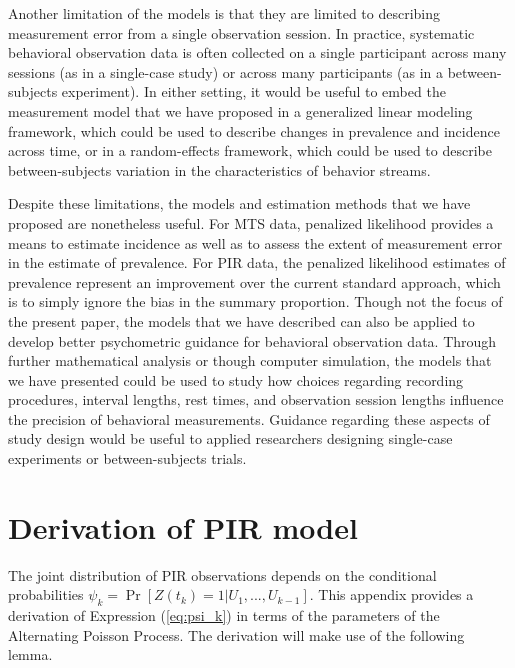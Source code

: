 \documentclass[man, noextraspace, floatsintext]{apa6}\usepackage[]{graphicx}\usepackage[]{color}
\newcommand{\bibfile}{Behavioral_observation-APP}
\begin{document}
Another limitation of the models is that they are limited to describing measurement error from a single observation session. In practice, systematic behavioral observation data is often collected on a single participant across many sessions (as in a single-case study) or across many participants (as in a between-subjects experiment). In either setting, it would be useful to embed the measurement model that we have proposed in a generalized linear modeling framework, which could be used to describe changes in prevalence and incidence across time, or in a random-effects framework, which could be used to describe between-subjects variation in the characteristics of behavior streams.

Despite these limitations, the models and estimation methods that we have proposed are nonetheless useful. For MTS data, penalized likelihood provides a means to estimate incidence as well as to assess the extent of measurement error in the estimate of prevalence. For PIR data, the penalized likelihood estimates of prevalence represent an improvement over the current standard approach, which is to simply ignore the bias in the summary proportion. Though not the focus of the present paper, the models that we have described can also be applied to develop better psychometric guidance for behavioral observation data. Through further mathematical analysis or though computer simulation, the models that we have presented could be used to study how choices regarding recording procedures, interval lengths, rest times, and observation session lengths influence the precision of behavioral measurements. Guidance regarding these aspects of study design would be useful to applied researchers designing single-case experiments or between-subjects trials.



 
\appendix

\section{Derivation of PIR model}
\label{app:PIR_derivation}

The joint distribution of PIR observations depends on the conditional probabilities $\psi_k = \Pr\left[ Z(t_k) = 1 \left| U_1,...,U_{k-1}\right.\right]$. 
This appendix provides a derivation of Expression (\ref{eq:psi_k}) in terms of the parameters of the Alternating Poisson Process. The derivation will make use of the following lemma.
\end{document}
